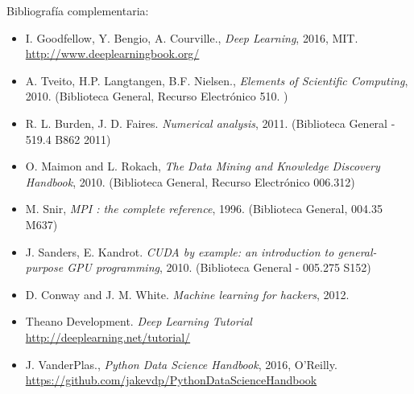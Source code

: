 \documentclass[letterpaper,10pt,onecolumn]{article}
\begin{document}
\noindent\normalsize Bibliograf\'ia complementaria:

\begin{itemize}
\item I. Goodfellow, Y. Bengio, A. Courville., \textit{Deep Learning}, 
  2016, MIT.\\
  \url{http://www.deeplearningbook.org/}
  \\[-0.6cm] 
\item A. Tveito, H.P. Langtangen, B.F. Nielsen., \textit{Elements of
  Scientific Computing}, 2010.  (Biblioteca General, Recurso
  Electr\'onico 510. )\\[-0.6cm] 
\item R. L. Burden, J. D. Faires. \textit{Numerical analysis},
  2011. (Biblioteca General - 519.4 B862 2011)\\[-0.6cm]
\item O. Maimon and L. Rokach, \textit{The Data Mining and Knowledge
  Discovery Handbook}, 2010. (Biblioteca General, Recurso
  Electr\'onico 006.312)\\[-0.6cm]
\item M. Snir, \textit{MPI : the complete reference},
  1996. (Biblioteca General, 004.35 M637)\\[-0.6cm]
\item J. Sanders, E. Kandrot. \textit{CUDA by example: an
  introduction to general-purpose GPU programming}, 2010. (Biblioteca
  General - 005.275 S152)\\[-0.6cm]
\item D. Conway and J. M. White. \textit{Machine learning for
    hackers}, 2012.\\[-0.6cm]
\item Theano Development. \textit{Deep Learning Tutorial}
  \url{http://deeplearning.net/tutorial/}  \\[-0.6cm]
\item J. VanderPlas., \textit{Python Data Science Handbook}, 2016,
  O'Reilly.\\
  \url{https://github.com/jakevdp/PythonDataScienceHandbook} 
  \\[-0.2cm] 
\end{itemize}
\end{document}
